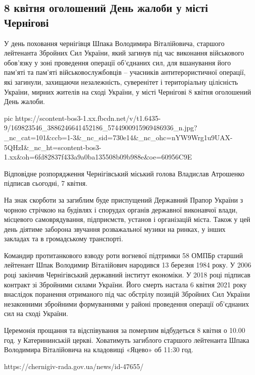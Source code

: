  
 
 
 
 

\subsection{8 квітня оголошений День жалоби у місті Чернігові}

У день поховання чернігівця Шпака Володимира Віталійовича, старшого лейтенанта
Збройних Сил України, який загинув під час виконання військового обов’язку у
зоні проведення операції об’єднаних сил, для вшанування його пам'яті та пам’яті
військовослужбовців – учасників антитерористичної операції, які загинули,
захищаючи незалежність, суверенітет і територіальну цілісність України, мирних
жителів на сході України, у місті Чернігові 8 квітня оголошений День жалоби.

\ifcmt
  pic https://scontent-bos3-1.xx.fbcdn.net/v/t1.6435-9/169823546_3886246641452186_5744900915969486936_n.jpg?_nc_cat=101&ccb=1-3&_nc_sid=730e14&_nc_ohc=nYW9Wrg1u9UAX-5QHzI&_nc_ht=scontent-bos3-1.xx&oh=6fd82837f433a9a0ba135508b09b988e&oe=60956C9E
\fi

Відповідне розпорядження Чернігівський міський голова Владислав Атрошенко
підписав сьогодні, 7 квітня.

На знак скорботи за загиблим буде приспущений Державний Прапор України з чорною
стрічкою на будівлях і спорудах органів державної виконавчої влади, місцевого
самоврядування, підприємств, установ і організацій міста. Також у цей день
діятиме заборона звучання розважальної музики на ринках, у інших закладах та в
громадському транспорті.

Командир протитанкового взводу роти вогневої підтримки 58 ОМПБр старший
лейтенант Шпак Володимир Віталійович народився 13 березня 1984 року. У 2006
році закінчив Чернігівський державний інститут економіки. У 2018 році підписав
контракт зі Збройними силами України. Його смерть настала 6 квітня 2021 року
внаслідок поранення отриманого під час обстрілу позицій Збройних Сил України
незаконними збройними формуваннями у районі проведення операції об'єднаних сил
на сході України.

Церемонія прощання та відспівування за померлим відбудеться 8 квітня о 10.00
год. у Катерининській церкві. Ховатимуть загиблого старшого лейтенанта Шпака
Володимира Віталійовича на кладовищі «Яцево» об 11:30 год.

https://chernigiv-rada.gov.ua/news/id-47655/
